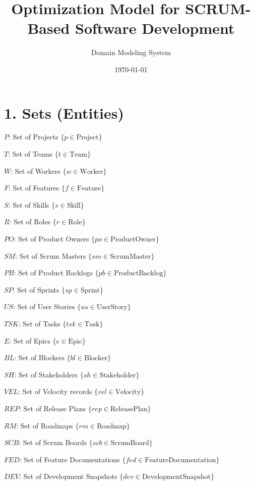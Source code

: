 \documentclass[12pt]{article}
\title{Optimization Model for SCRUM-Based Software Development}
\author{Domain Modeling System}
\date{\today}
\begin{document}
\maketitle
\tableofcontents
\newpage

\section{1. Sets (Entities)}
\item $P$: Set of Projects $\{ p \in \text{Project} \}$
    \item $T$: Set of Teams $\{ t \in \text{Team} \}$
    \item $W$: Set of Workers $\{ w \in \text{Worker} \}$
    \item $F$: Set of Features $\{ f \in \text{Feature} \}$
    \item $S$: Set of Skills $\{ s \in \text{Skill} \}$
    \item $R$: Set of Roles $\{ r \in \text{Role} \}$
    \item $PO$: Set of Product Owners $\{ po \in \text{ProductOwner} \}$
    \item $SM$: Set of Scrum Masters $\{ sm \in \text{ScrumMaster} \}$
    \item $PB$: Set of Product Backlogs $\{ pb \in \text{ProductBacklog} \}$
    \item $SP$: Set of Sprints $\{ sp \in \text{Sprint} \}$
    \item $US$: Set of User Stories $\{ us \in \text{UserStory} \}$
    \item $TSK$: Set of Tasks $\{ tsk \in \text{Task} \}$
    \item $E$: Set of Epics $\{ e \in \text{Epic} \}$
    \item $BL$: Set of Blockers $\{ bl \in \text{Blocker} \}$
    \item $SH$: Set of Stakeholders $\{ sh \in \text{Stakeholder} \}$
    \item $VEL$: Set of Velocity records $\{ vel \in \text{Velocity} \}$
    \item $REP$: Set of Release Plans $\{ rep \in \text{ReleasePlan} \}$
    \item $RM$: Set of Roadmaps $\{ rm \in \text{Roadmap} \}$
    \item $SCB$: Set of Scrum Boards $\{ scb \in \text{ScrumBoard} \}$
    \item $FED$: Set of Feature Documentations $\{ fed \in \text{FeatureDocumentation} \}$
    \item $DEV$: Set of Development Snapshots $\{ dev \in \text{DevelopmentSnapshot} \}$
\end{document}
